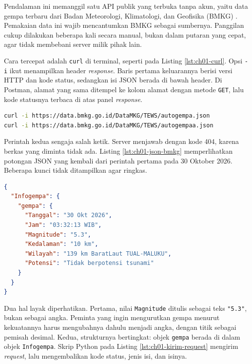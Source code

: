 \begin{pendalaman}
Pendalaman ini memanggil satu API publik yang terbuka tanpa akun, yaitu data
gempa terbaru dari Badan Meteorologi, Klimatologi, dan Geofisika (BMKG)
\cite{c01-bmkg-gempa}. Pemakaian data ini wajib mencantumkan BMKG sebagai
sumbernya. Panggilan cukup dilakukan beberapa kali secara manual, bukan dalam
putaran yang cepat, agar tidak membebani server milik pihak lain.

Cara tercepat adalah \texttt{curl} di terminal, seperti pada Listing
\ref{lst:ch01-curl}. Opsi \texttt{-i} ikut menampilkan header \textit{response}.
Baris pertama keluarannya berisi versi HTTP dan kode status, sedangkan isi JSON
berada di bawah header. Di Postman, alamat yang sama ditempel ke kolom alamat
dengan metode \texttt{GET}, lalu kode statusnya terbaca di atas panel
\textit{response}.

\begin{lstlisting}[language=bash, caption={Memanggil API gempa terbaru BMKG dengan curl, padanannya dalam Python tersedia di \berkas{sources/chapter01/panggil-api-publik.py}}, label={lst:ch01-curl}]
curl -i https://data.bmkg.go.id/DataMKG/TEWS/autogempa.json
curl -i https://data.bmkg.go.id/DataMKG/TEWS/autogempaa.json
\end{lstlisting}

Perintah kedua sengaja salah ketik. Server menjawab dengan kode 404, karena
berkas yang diminta tidak ada. Listing \ref{lst:ch01-json-bmkg} memperlihatkan
potongan JSON yang kembali dari perintah pertama pada 30 Oktober 2026. Beberapa
kunci tidak ditampilkan agar ringkas.

\begin{lstlisting}[language=json, caption={Potongan isi response API gempa terbaru BMKG, 30 Oktober 2026, dibaca dengan \berkas{sources/chapter01/panggil-api-publik.py}}, label={lst:ch01-json-bmkg}]
{
  "Infogempa": {
    "gempa": {
      "Tanggal": "30 Okt 2026",
      "Jam": "03:32:13 WIB",
      "Magnitude": "5.3",
      "Kedalaman": "10 km",
      "Wilayah": "139 km BaratLaut TUAL-MALUKU",
      "Potensi": "Tidak berpotensi tsunami"
    }
  }
}
\end{lstlisting}

Dua hal layak diperhatikan. Pertama, nilai \texttt{Magnitude} ditulis sebagai
teks \texttt{"5.3"}, bukan sebagai angka. Peminta yang ingin mengurutkan gempa
menurut kekuatannya harus mengubahnya dahulu menjadi angka, dengan titik sebagai
pemisah desimal. Kedua, strukturnya bertingkat: objek \texttt{gempa} berada di
dalam objek \texttt{Infogempa}. Skrip Python pada Listing
\ref{lst:ch01-kirim-request} mengirim \textit{request}, lalu mengembalikan kode
status, jenis isi, dan isinya.


\end{pendalaman}

